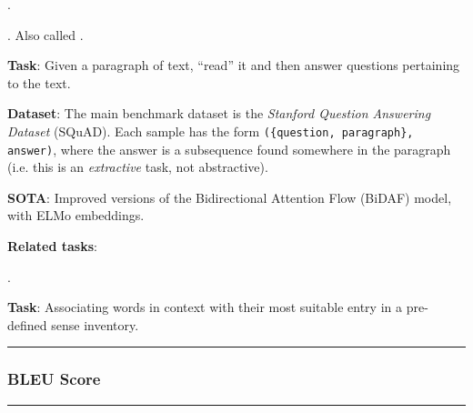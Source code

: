 \documentclass[11pt]{article}
\newcommand\myspace[1][]{\vspace{#1\bigskipamount}}
\newcommand\p{\Needspace{10\baselineskip} \noindent}
\newcommand\subsub[1]{\Needspace{15\baselineskip}\hrule\subsubsection{#1}\hrule}
\begin{document}
\myspace 
\p {}. 


\myspace
\p {}. Also called . 
\begin{compactitem}
	\item \textbf{Task}: Given a paragraph of text, ``read'' it and then answer questions pertaining to the text. 
	
	\item \textbf{Dataset}: The main benchmark dataset is the \textit{Stanford Question Answering Dataset} (SQuAD). Each sample has the form \texttt{(\{question, paragraph\}, answer)}, where the answer is a subsequence found somewhere in the paragraph (i.e. this is an \textit{extractive} task, not abstractive).
	
	\item \textbf{SOTA}: Improved versions of the Bidirectional Attention Flow (BiDAF) model, with ELMo embeddings.
	
	\item \textbf{Related tasks}:
\end{compactitem}

\myspace
\p {}. 
\begin{compactitem}
	\item \textbf{Task}: Associating words in context with their most suitable entry in a pre-defined sense inventory.
\end{compactitem}



\myspace
\subsub{BLEU Score}
\myspace
\end{document}
